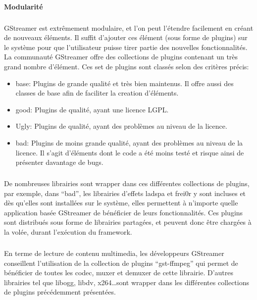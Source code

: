 \paragraph {Modularité}

\subparagraph{}

GStreamer est extrêmement modulaire, et l'on peut l'étendre facilement
en créant de nouveaux éléments. Il suffit d'ajouter ces élément (sous
forme de plugins) sur le système pour que l'utilisateur puisse tirer
partie des nouvelles fonctionnalités. La communauté GStreamer offre des
collections de plugins contenant un très grand nombre d'élément. Ces
set de plugins sont classés selon des critères précis:

\begin{itemize}

  \item {base: Plugins de grande qualité et très bien maintenus. Il
  offre aussi
    des classes de base afin de faciliter la creation d'éléments.}

  \item {good: Plugins de qualité, ayant une licence LGPL}.

  \item {Ugly: Plugins de qualité, ayant des problèmes au niveau de
  la licence.}

  \item {bad: Plugins de moins grande qualité, ayant des problèmes
  au niveau
    de la licence. Il s'agit d'éléments dont le code a été
    moins testé et risque ainsi de présenter davantage de bugs.}

\end{itemize}

\subparagraph{}

De nombreuses librairies sont wrapper dans ces différentes collections
de plugins, par exemple, dans ``bad'', les librairies d'effets ladspa
et frei0r y sont incluses et dès qu'elles sont
installées sur le système, elles permettent à n'importe quelle application basée GStreamer
de bénéficier de leurs fonctionnalités.  Ces plugins sont distribués
sous forme de librairies partagées, et peuvent donc être chargées à la
volée, durant l'exécution du framework.

\subparagraph{}

En terme de lecture de contenu multimedia, les développeurs GStreamer
conseillent l'utilisation de la collection de plugins ``gst-ffmpeg''
qui permet de bénéficier de toutes les codec, muxer et demuxer de cette
librairie. D'autres librairies tel que libogg, libdv, x264\ldots sont
wrapper dans les différentes collections de plugins précédemment
présentées.

